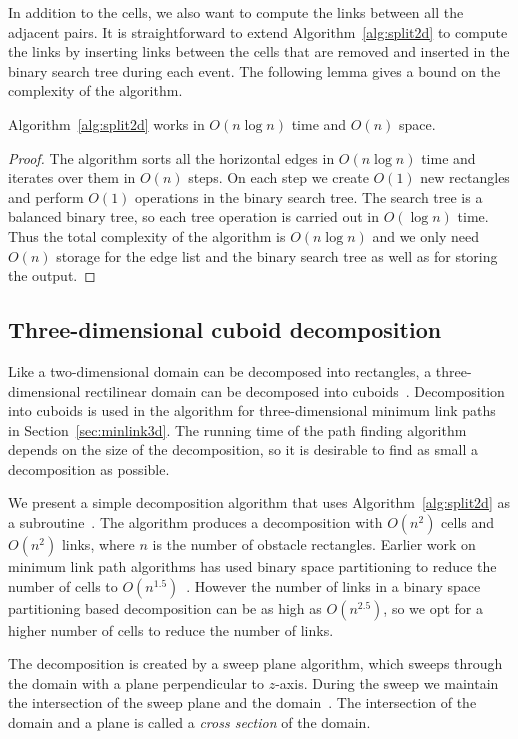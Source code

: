 \documentclass[english,gradu]{tktltiki2018}
\begin{document}
In addition to the cells, we also want to compute the links between all the adjacent pairs.
It is straightforward to extend Algorithm~\ref{alg:split2d} to compute the links by inserting links between the cells that are removed and inserted in the binary search tree during each event.
The following lemma gives a bound on the complexity of the algorithm.

\begin{lem}\label{lem:split2dtime}Algorithm~\ref{alg:split2d} works in $O(n\log n)$ time and $O(n)$ space.\end{lem}
\begin{proof}
The algorithm sorts all the horizontal edges in $O(n\log n)$ time and iterates over them in $O(n)$ steps.
On each step we create $O(1)$ new rectangles and perform $O(1)$ operations in the binary search tree.
The search tree is a balanced binary tree, so each tree operation is carried out in $O(\log n)$ time.
Thus the total complexity of the algorithm is $O(n\log n)$ and we only need $O(n)$ storage for the edge list and the binary search tree as well as for storing the output.
\end{proof}

\subsection{Three-dimensional cuboid decomposition}\label{sec:split3d}

Like a two-dimensional domain can be decomposed into rectangles, a three-dimensional rectilinear domain can be decomposed into cuboids~\cite{restricted,wagner}.
Decomposition into cuboids is used in the algorithm for three-dimensional minimum link paths in Section~\ref{sec:minlink3d}.
The running time of the path finding algorithm depends on the size of the decomposition, so it is desirable to find as small a decomposition as possible.

We present a simple decomposition algorithm that uses Algorithm~\ref{alg:split2d} as a subroutine~\cite{restricted}.
The algorithm produces a decomposition with $O(n^2)$ cells and $O(n^2)$ links, where $n$ is the number of obstacle rectangles.
Earlier work on minimum link path algorithms has used binary space partitioning to reduce the number of cells to $O(n^{1.5})$~\cite{bsp,wagner}.
However the number of links in a binary space partitioning based decomposition can be as high as $O(n^{2.5})$, so we opt for a higher number of cells to reduce the number of links.

The decomposition is created by a sweep plane algorithm, which sweeps through the domain with a plane perpendicular to $z$-axis.
During the sweep we maintain the intersection of the sweep plane and the domain~\fspace.
The intersection of the domain and a plane is called a \emph{cross section} of the domain.
\end{document}
